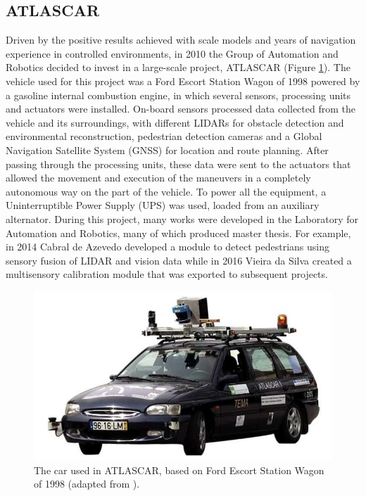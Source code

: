 \subsection{ATLASCAR}\label{sec:ATLASCAR}
Driven by the positive results achieved with scale models and years of navigation experience in controlled environments, in 2010 the Group of Automation and Robotics decided to invest in a large-scale project, ATLASCAR (Figure \ref{fig:atlascar1}). The vehicle used for this project was a Ford Escort Station Wagon of 1998 powered by a gasoline internal combustion engine, in which several sensors, processing units and actuators were installed. On-board sensors processed data collected from the vehicle and its surroundings, with different LIDARs for obstacle detection and environmental reconstruction, pedestrian detection cameras and a Global Navigation Satellite System (GNSS) for location and route planning. After passing through the processing units, these data were sent to the actuators that allowed the movement and execution of the maneuvers in a completely autonomous way on the part of the vehicle. To power all the equipment, a Uninterruptible Power Supply (UPS) was used, loaded from an auxiliary alternator. During this project, many works were developed in the Laboratory for Automation and Robotics, many of which produced master thesis. For example, in 2014 Cabral de Azevedo \cite{Azevedo2014} developed a module to detect pedestrians using sensory fusion of LIDAR and vision data while in 2016 Vieira da Silva \cite{Silva2016} created a multisensory calibration module that was exported to subsequent projects.
\begin{figure}[!h]
	\centering
	\includegraphics[width=\textwidth]{../figure/atlascar1.jpg}
	\caption{The car used in ATLASCAR, based on Ford Escort Station Wagon of 1998 (adapted from \cite{Pereira2012}).}
	\label{fig:atlascar1}
\end{figure}

